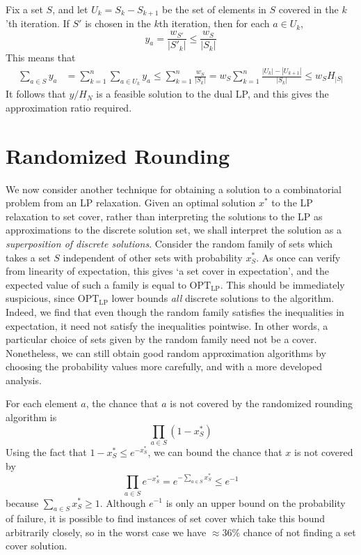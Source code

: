Fix a set $S$, and let $U_k = S_k - S_{k+1}$ be the set of elements in $S$ covered in the $k$'th iteration. If $S'$ is chosen in the $k$th iteration, then for each $a \in U_k$,
%
\[ y_a = \frac{w_{S'}}{|S'_k|} \leq \frac{w_S}{|S_k|} \]
%
This means that
%
\begin{align*}
    \sum_{a \in S} y_a &= \sum_{k = 1}^n \sum_{a \in U_k} y_a \leq \sum_{k = 1}^n \frac{w_S}{|S_k|} = w_S \sum_{k = 1}^n \frac{|U_k| - |U_{k+1}|}{|S_k|} \leq w_S H_{|S|}
\end{align*}
%
It follows that $y/H_N$ is a feasible solution to the dual LP, and this gives the approximation ratio required.

\section{Randomized Rounding}

We now consider another technique for obtaining a solution to a combinatorial problem from an LP relaxation. Given an optimal solution $x^*$ to the LP relaxation to set cover, rather than interpreting the solutions to the LP as approximations to the discrete solution set, we shall interpret the solution as a {\it superposition of discrete solutions}. Consider the random family of sets which takes a set $S$ independent of other sets with probability $x^*_S$. As once can verify from linearity of expectation, this gives `a set cover in expectation', and the expected value of such a family is equal to $\text{OPT}_{\text{LP}}$. This should be immediately suspicious, since $\text{OPT}_{\text{LP}}$ lower bounds {\it all} discrete solutions to the algorithm. Indeed, we find that even though the random family satisfies the inequalities in expectation, it need not satisfy the inequalities pointwise. In other words, a particular choice of sets given by the random family need not be a cover. Nonetheless, we can still obtain good random approximation algorithms by choosing the probability values more carefully, and with a more developed analysis.

For each element $a$, the chance that $a$ is not covered by the randomized rounding algorithm is
%
\[ \prod_{a \in S} (1 - x^*_S) \]
%
Using the fact that $1 - x^*_S \leq e^{-x^*_S}$, we can bound the chance that $x$ is not covered by
%
\[ \prod_{a \in S} e^{-x^*_S} = e^{- \sum_{a \in S} x^*_S} \leq e^{-1} \]
%
because $\sum_{a \in S} x^*_S \geq 1$. Although $e^{-1}$ is only an upper bound on the probability of failure, it is possible to find instances of set cover which take this bound arbitrarily closely, so in the worst case we have $\approx 36 \%$ chance of not finding a set cover solution.

